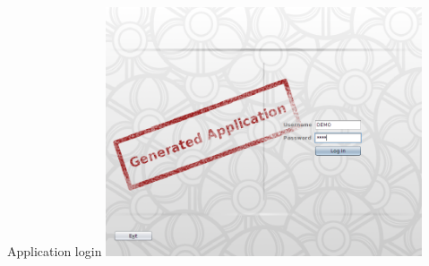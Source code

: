   \begin{image}{Application login}{\label{img:ch00:02:client_login}}    
    \includegraphics[width=0.7\textwidth]{parts/00-part/chapters/01-application-modules/images/04-client-login.png}
  \end{image}